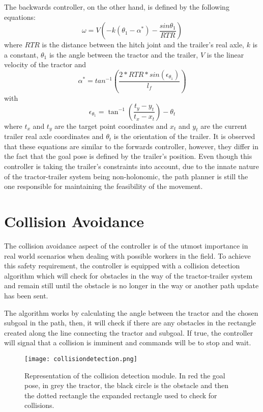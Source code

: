 The backwards controller, on the other hand, is defined by the following equations:
\begin{equation}
    \omega = V \left(-k (\theta_1 - \alpha^*) - \frac{sin\theta_1}{RTR}\right)
\end{equation}
where $RTR$ is the distance between the hitch joint and the trailer's real axle, 
$k$ is a constant, $\theta_1$ is the angle between the tractor and the trailer, 
$V$ is the linear velocity of the tractor and 
\begin{equation}
    \alpha^* = tan^{-1}\left(\frac{2*RTR*sin(\epsilon_{\theta_1})}{l_f}\right)
\end{equation}
with
\begin{equation}
    \epsilon_{\theta_1} = \tan^{-1}\left(\frac{t_y - y_t}{t_x - x_t}\right) - \theta_t
\end{equation}
where $t_x$ and $t_y$ are the target point coordinates and $x_t$ and $y_t$ are the current trailer real axle coordinates and 
$\theta_t$ is the orientation of the trailer. It is observed that 
these equations are similar to the forwards controller, however, they differ 
in the fact that the goal pose is defined by the trailer's position. Even though 
this controller is taking the trailer's constraints into account, due to 
the innate nature of the tractor-trailer system being non-holonomic, the 
path planner is still the one responsible for maintaining the feasibility 
of the movement.


\section{Collision Avoidance}
\label{sec:collision}
The collision avoidance aspect of the controller is of the utmost importance 
in real world scenarios when dealing with possible workers in the field. To achieve 
this safety requirement, the controller is equipped with a collision detection algorithm 
which will check for obstacles in the way of the tractor-trailer system and remain still until the 
obstacle is no longer in the way or another path update has been sent.

The algorithm works by calculating the angle between the tractor and the chosen 
subgoal in the path, then, it will check if there are any obstacles in the rectangle 
created along the line connecting the tractor and subgoal. If true, the controller will 
signal that a collision is imminent and commands will be to stop and wait.

\begin{figure}[h]
    \centering
    \texttt{[image: collisiondetection.png]}
    \caption{Representation of the collision detection module. In red the goal pose, in grey the tractor, the black circle is the obstacle and then the dotted rectangle the expanded rectangle used to check for collisions.}
    \label{fig:collisiondetection}
\end{figure}

